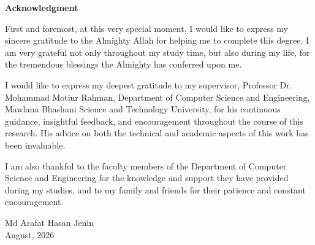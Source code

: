 \setcounter{page}{2}

\centering
\textbf{Acknowledgment}

\vspace{.5cm}

\justifying
\noindent
First and foremost, at this very special moment, I would like to express my sincere gratitude to the Almighty Allah for helping me to complete this degree. I am very grateful not only throughout my study time, but also during my life, for the tremendous blessings the Almighty has conferred upon me.

\vspace{3mm}
\noindent
I would like to express my deepest gratitude to my supervisor, Professor Dr. Mohammad Motiur Rahman, Department of Computer Science and Engineering, Mawlana Bhashani Science and Technology University, for his continuous guidance, insightful feedback, and encouragement throughout the course of this research. His advice on both the technical and academic aspects of this work has been invaluable.

\vspace{3mm}
\noindent
I am also thankful to the faculty members of the Department of Computer Science and Engineering for the knowledge and support they have provided during my studies, and to my family and friends for their patience and constant encouragement.

\vspace{3cm}

\begin{flushright}
         Md Arafat Hasan Jenin\\
    August, 2026


\end{flushright}
